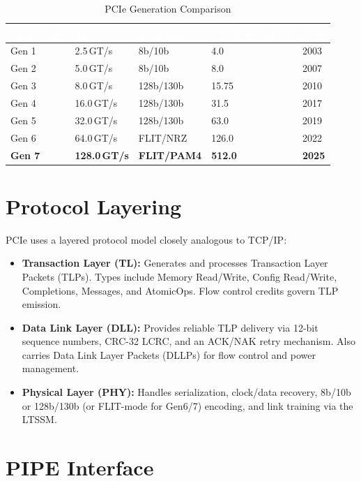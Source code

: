 \documentclass[12pt,a4paper]{report}
\newcommand{\theadcell}[1]{%
  \cellcolor{tablehead}\textcolor{white}{\textbf{#1}}}
\begin{document}
\begin{table}[H]
\centering
\caption{PCIe Generation Comparison}
\label{tab:pcie_gen}
\begin{tabular}{lllll}
  \toprule
  \theadcell{Generation} & \theadcell{Speed} & \theadcell{Encoding} &
  \theadcell{$\times$16 BW (GB/s)} & \theadcell{Year} \\
  \midrule
  Gen 1 & 2.5\,GT/s  & 8b/10b   & 4.0   & 2003 \\
  Gen 2 & 5.0\,GT/s  & 8b/10b   & 8.0   & 2007 \\
  Gen 3 & 8.0\,GT/s  & 128b/130b& 15.75 & 2010 \\
  Gen 4 & 16.0\,GT/s & 128b/130b& 31.5  & 2017 \\
  Gen 5 & 32.0\,GT/s & 128b/130b& 63.0  & 2019 \\
  Gen 6 & 64.0\,GT/s & FLIT/NRZ & 126.0 & 2022 \\
  \textbf{Gen 7} & \textbf{128.0\,GT/s} & \textbf{FLIT/PAM4} & \textbf{512.0} & \textbf{2025} \\
  \bottomrule
\end{tabular}
\end{table}

\section{Protocol Layering}

PCIe uses a layered protocol model closely analogous to TCP/IP:

\begin{itemize}[noitemsep]
  \item \textbf{Transaction Layer (TL):} Generates and processes Transaction Layer
    Packets (TLPs). Types include Memory Read/Write, Config Read/Write, Completions,
    Messages, and AtomicOps. Flow control credits govern TLP emission.
  \item \textbf{Data Link Layer (DLL):} Provides reliable TLP delivery via 12-bit
    sequence numbers, CRC-32 LCRC, and an ACK/NAK retry mechanism. Also carries
    Data Link Layer Packets (DLLPs) for flow control and power management.
  \item \textbf{Physical Layer (PHY):} Handles serialization, clock/data recovery,
    8b/10b or 128b/130b (or FLIT-mode for Gen6/7) encoding, and link training via
    the LTSSM.
\end{itemize}

\section{PIPE Interface}
\end{document}
